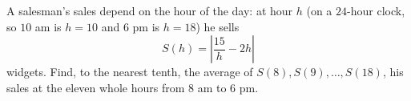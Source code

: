 A salesman's sales depend on the hour of the day: at hour $h$ (on a $24$-hour clock, so $10$ am is $h=10$ and $6$ pm is $h=18$) he sells
\[S(h)=\left|\dfrac{15}{h}-2h\right|\]
widgets. Find, to the nearest tenth, the average of $S(8),S(9),\dots,S(18)$, his sales at the eleven whole hours from $8$ am to $6$ pm.
